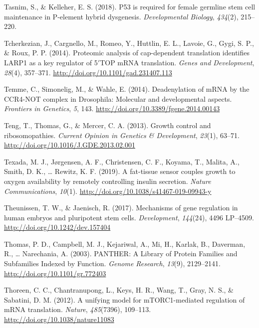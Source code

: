 \documentclass[12pt,twoside]{reedthesis}
\newlength{\cslhangindent}
\newenvironment{cslreferences}%
  {\setlength{\parindent}{0pt}%
  \everypar{\setlength{\hangindent}{\cslhangindent}}\ignorespaces}%
  {\par}
\begin{document}
\begin{cslreferences}
\leavevmode\hypertarget{ref-Tasnim2018a}{}%
Tasnim, S., \& Kelleher, E. S. (2018). P53 is required for female germline stem cell maintenance in P-element hybrid dysgenesis. \emph{Developmental Biology}, \emph{434}(2), 215--220.

\leavevmode\hypertarget{ref-Tcherkezian2014b}{}%
Tcherkezian, J., Cargnello, M., Romeo, Y., Huttlin, E. L., Lavoie, G., Gygi, S. P., \& Roux, P. P. (2014). Proteomic analysis of cap-dependent translation identifies LARP1 as a key regulator of 5\({'}\)TOP mRNA translation. \emph{Genes and Development}, \emph{28}(4), 357--371. \url{http://doi.org/10.1101/gad.231407.113}

\leavevmode\hypertarget{ref-Temme2014j}{}%
Temme, C., Simonelig, M., \& Wahle, E. (2014). Deadenylation of mRNA by the CCR4-NOT complex in Drosophila: Molecular and developmental aspects. \emph{Frontiers in Genetics}, \emph{5}, 143. \url{http://doi.org/10.3389/fgene.2014.00143}

\leavevmode\hypertarget{ref-Teng2013}{}%
Teng, T., Thomas, G., \& Mercer, C. A. (2013). Growth control and ribosomopathies. \emph{Current Opinion in Genetics \& Development}, \emph{23}(1), 63--71. \url{http://doi.org/10.1016/J.GDE.2013.02.001}

\leavevmode\hypertarget{ref-Texada2019}{}%
Texada, M. J., Jørgensen, A. F., Christensen, C. F., Koyama, T., Malita, A., Smith, D. K., \ldots{} Rewitz, K. F. (2019). A fat-tissue sensor couples growth to oxygen availability by remotely controlling insulin secretion. \emph{Nature Communications}, \emph{10}(1). \url{http://doi.org/10.1038/s41467-019-09943-y}

\leavevmode\hypertarget{ref-Theunissen2017b}{}%
Theunissen, T. W., \& Jaenisch, R. (2017). Mechanisms of gene regulation in human embryos and pluripotent stem cells. \emph{Development}, \emph{144}(24), 4496 LP--4509. \url{http://doi.org/10.1242/dev.157404}

\leavevmode\hypertarget{ref-thomasPANTHERLibraryProtein2003}{}%
Thomas, P. D., Campbell, M. J., Kejariwal, A., Mi, H., Karlak, B., Daverman, R., \ldots{} Narechania, A. (2003). PANTHER: A Library of Protein Families and Subfamilies Indexed by Function. \emph{Genome Research}, \emph{13}(9), 2129--2141. \url{http://doi.org/10.1101/gr.772403}

\leavevmode\hypertarget{ref-thoreenUnifyingModelMTORC1mediated2012}{}%
Thoreen, C. C., Chantranupong, L., Keys, H. R., Wang, T., Gray, N. S., \& Sabatini, D. M. (2012). A unifying model for mTORC1-mediated regulation of mRNA translation. \emph{Nature}, \emph{485}(7396), 109--113. \url{http://doi.org/10.1038/nature11083}


\end{cslreferences}
\end{document}
